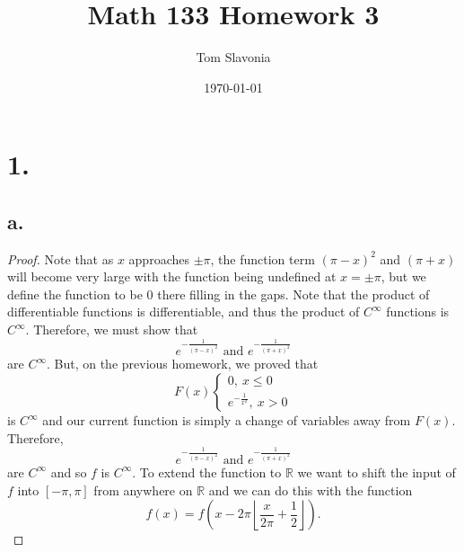 \documentclass{article}
\title{Math 133 Homework 3}
\author{Tom Slavonia}
\date{\today}
\begin{document}
\maketitle
\section*{1.}
\subsection*{a.}
\begin{proof}
    Note that as $x$ approaches $\pm \pi$, the function term $(\pi - x)^2$ and $(\pi + x)$ will become very large with the function being undefined at $x = \pm \pi$, but we define the function to be $0$ there filling in the gaps. Note that the product of differentiable functions is differentiable, and thus the product of $C^{\infty}$ functions is $C^{\infty}$. Therefore, we must show that 
    \[
    e^{-\frac{1}{(\pi - x)^2}} \text{ and } e^{-\frac{1}{(\pi + x)^2}}    
    \]
    are $C^{\infty}$. But, on the previous homework, we proved that 
    \[
    F(x) \begin{cases}
        0, \ x \leq 0 \\
        e^{-\frac{1}{x^2}}, \ x > 0
    \end{cases}    
    \]
    is $C^{\infty}$ and our current function is simply a change of variables away from $F(x)$. Therefore, 
    \[
        e^{-\frac{1}{(\pi - x)^2}} \text{ and } e^{-\frac{1}{(\pi + x)^2}}  
    \]
    are $C^{\infty}$ and so $f$ is $C^{\infty}$. To extend the function to $\mathbb{R}$ we want to shift the input of $f$ into $[-\pi, \pi]$ from anywhere on $\mathbb{R}$ and we can do this with the function
    \[
    f(x) = f\left(x - 2 \pi \left\lfloor \frac{x}{2 \pi } + \frac{1}{2} \right\rfloor \right).    
    \]
\end{proof}
\end{document}
